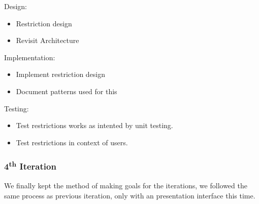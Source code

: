   Design:
  \begin{itemize}
    \item Restriction design
    \item Revisit Architecture
  \end{itemize}

  Implementation:
  \begin{itemize}
    \item Implement restriction design
    \item Document patterns used for this
  \end{itemize}

  Testing:
  \begin{itemize}
    \item Test restrictions works as intented by unit testing.
    \item Test restrictions in context of users.
  \end{itemize}

\subsubsection{4\textsuperscript{th} Iteration}

  We finally kept the method of making goals for the iterations, we followed the same process as previous iteration, only with an presentation interface this time.
